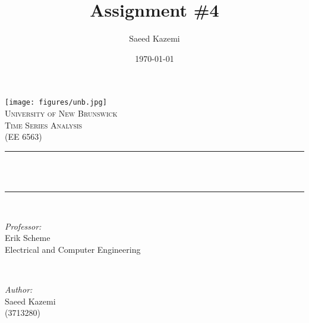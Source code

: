 \documentclass[12pt]{article}
\title{Assignment \#4}				%
\author{Saeed Kazemi}				%
\date{\today}						%
\makeatletter
\let\thedate\@date
\let\thetitle\@title
\makeatother
\begin{document}


\begin{titlepage}
	\centering
    \vspace*{0.4 cm}
    \texttt{[image: figures/unb.jpg]}\\[1.0 cm]	%
    \textsc{\LARGE \newline\newline University of New Brunswick}\\[1.8 cm]	%
	\textsc{\Large Time Series Analysis\\(EE 6563)}\\[0.5 cm]				%
	\rule{\linewidth}{0.2 mm} \\[0.4 cm]
	{ \huge \bfseries \thetitle}\\
	\rule{\linewidth}{0.2 mm} \\[1.5 cm]
	
	\begin{minipage}{0.5\textwidth}
		\begin{flushleft} \large
			\emph{Professor:}\\
			Erik Scheme\\
            Electrical and Computer Engineering\\
			\end{flushleft}
			\end{minipage}~
			\begin{minipage}{0.5\textwidth}
            
			\begin{flushright} \large
			\emph{Author:} \\
			Saeed Kazemi\\ (3713280)\\

		\end{flushright}
        
	\end{minipage}\\[1 cm]
	
	
    \thedate
    
    
    
	
\end{titlepage}




\pagebreak
\end{document}
